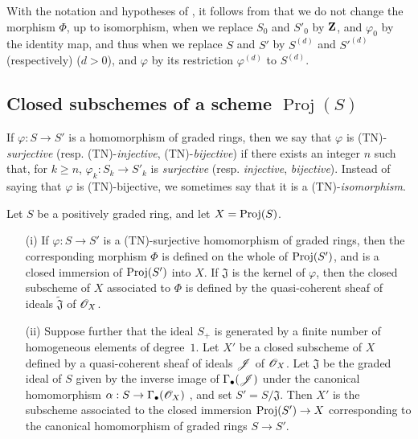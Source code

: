 \begin{env}[2.8.15]
\label{II.2.8.15}
With the notation and hypotheses of , it follows from  that we do not change the morphism $\Phi$, up to isomorphism, when we replace $S_0$ and $S'_0$ by $\mathbf{Z}$, and $\varphi_0$ by the identity map, and thus when we replace $S$ and $S'$ by $S^{(d)}$ and ${S'}^{(d)}$ (respectively) ($d>0$), and $\varphi$ by its restriction $\varphi^{(d)}$ to $S^{(d)}$.
\end{env}


\subsection{Closed subschemes of a scheme $\operatorname{Proj}(S)$}
\label{subsection:II.2.9}

\begin{env}[2.9.1]
\label{II.2.9.1}
If $\varphi:S\to S'$ is a homomorphism of graded rings, then we say that $\varphi$ is (TN)-\emph{surjective} (resp. (TN)-\emph{injective}, (TN)-\emph{bijective}) if there exists an integer $n$ such that, for $k\geq n$, $\varphi_k:S_k\to S'_k$ is \emph{surjective} (resp. \emph{injective}, \emph{bijective}).
Instead of saying that $\varphi$ is (TN)-bijective, we sometimes say that it is a (TN)-\emph{isomorphism}.
\end{env}

\begin{proposition}[2.9.2]
\label{II.2.9.2}
Let $S$ be a positively graded ring, and let $X=\operatorname{Proj}(S)$.
\begin{enumerate}
  \item[\rm{(i)}] If $\varphi:S\to S'$ is a (TN)-surjective homomorphism of graded rings, then the corresponding morphism $\Phi$  is defined on the whole of $\operatorname{Proj}(S')$, and is a closed immersion of $\operatorname{Proj}(S')$ into $X$.
    If $\mathfrak{J}$ is the kernel of $\varphi$, then the closed subscheme of $X$ associated to $\Phi$ is defined by the quasi-coherent sheaf of ideals $\widetilde{\mathfrak{J}}$ of $\mathscr{O}_X$.
  \item[\rm{(ii)}] Suppose further that the ideal $S_+$ is generated by a finite number of homogeneous elements of degree~$1$.
    Let $X'$ be a closed subscheme of $X$ defined by a quasi-coherent sheaf of ideals $\mathscr{J}$ of $\mathscr{O}_X$.
    Let $\mathfrak{J}$ be the graded ideal of $S$ given by the inverse image of $\Gamma_\bullet(\mathscr{J})$ under the canonical homomorphism $\alpha:S\to\Gamma_\bullet(\sh{O}_X)$ , and set $S'=S/\mathfrak{J}$.
    Then $X'$ is the subscheme associated to the closed immersion $\Proj(S')\to X$ corresponding to the canonical homomorphism of graded rings $S\to S'$.
\end{enumerate}
\end{proposition}

